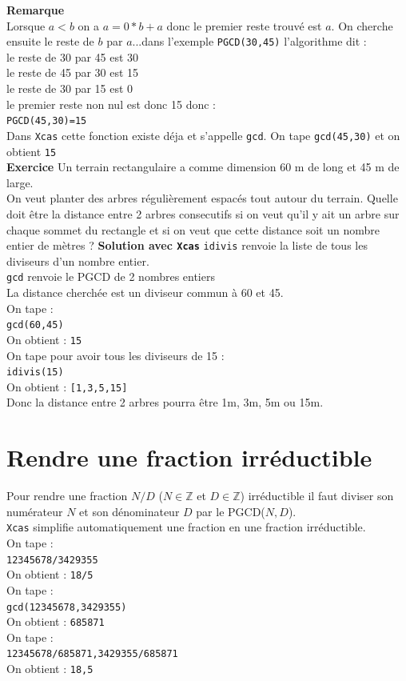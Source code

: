 \documentclass[a4paper,11pt]{book}
\newcommand{\Z}{{\mathbb{Z}}}
\begin{document}
{\bf Remarque}\\
Lorsque $a<b$ on a $a=0*b+a$ donc le premier reste trouv\'e est $a$. On cherche 
ensuite le reste de  $b$ par $a$...dans l'exemple {\tt PGCD(30,45)}
l'algorithme dit :\\
le reste de 30 par 45 est 30\\
le  reste de 45 par 30 est 15\\
le  reste de 30 par 15 est 0\\
le premier reste non nul est donc 15 donc :\\
{\tt PGCD(45,30)=15} \\
Dans {\tt Xcas} cette fonction existe d\'eja et s'appelle {\tt gcd}.
On tape {\tt gcd(45,30)} et on obtient {\tt 15}\\
{\bf Exercice}
Un terrain rectangulaire a comme dimension 60 m de long et 45 m de large.\\
On veut planter des arbres r\'eguli\`erement espac\'es tout autour du terrain.
Quelle doit \^etre la distance entre 2 arbres consecutifs si on veut qu'il y 
ait un arbre sur chaque sommet du rectangle et si on veut que cette distance 
soit un nombre entier de m\`etres ?
{\bf Solution avec {\tt Xcas}}
{\tt idivis} renvoie la liste de tous les diviseurs d'un nombre entier.\\
{\tt gcd} renvoie le PGCD de 2 nombres entiers\\
La distance cherch\'ee est un diviseur commun \`a 60 et 45.\\
On tape :\\
{\tt gcd(60,45)}\\
On obtient : {\tt 15}\\
On tape pour avoir tous les diviseurs de 15 :\\
{\tt idivis(15)}\\
On obtient : {\tt [1,3,5,15]}\\
Donc la distance entre 2 arbres pourra \^etre 1m, 3m, 5m ou 15m.

\section{Rendre une fraction irr\'eductible}
Pour rendre une fraction $N/D$ ($N\in \Z$ et $D\in \Z$) irr\'eductible il faut 
diviser son num\'erateur $N$ et son d\'enominateur $D$ par le PGCD($N,D$).\\
{\tt Xcas} simplifie automatiquement une fraction en une fraction 
irr\'eductible.\\
On tape :\\
{\tt 12345678/3429355}\\
On obtient : {\tt 18/5}\\
On tape :\\
{\tt gcd(12345678,3429355)}\\
On obtient : {\tt 685871}\\
On tape :\\
{\tt 12345678/685871,3429355/685871}\\
On obtient : {\tt 18,5}
\end{document}
